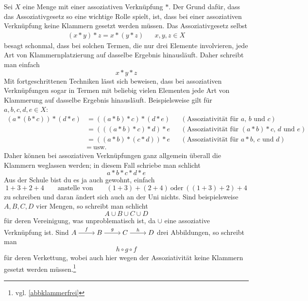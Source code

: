 \begin{bem} \label{klammerfrei}
    Sei $X$ eine Menge mit einer assoziativen Verknüpfung $*$. Der Grund dafür, dass das Assoziativgesetz so eine wichtige Rolle spielt, ist, dass bei einer assoziativen Verknüpfung keine Klammern gesetzt werden müssen. Das Assoziativgesetz selbst
    \begin{align*}
        (x*y)*z = x*(y*z) && x,y,z\in X
    \end{align*}
    besagt schonmal, dass bei solchen Termen, die nur drei Elemente involvieren, jede Art von Klammernplatzierung auf dasselbe Ergebnis hinausläuft. Daher schreibt man einfach
        \[ x*y*z \]
    Mit fortgeschrittenen Techniken lässt sich beweisen, dass bei assoziativen Verknüpfungen sogar in Termen mit beliebig vielen Elementen jede Art von Klammerung auf dasselbe Ergebnis hinausläuft. Beispielsweise gilt für $a,b,c,d,e\in X$:
    \begin{align*}
        (a*(b*c))*(d*e) & =((a*b)*c)*(d*e) && (\text{Assoziativität für $a$, $b$ und $c$})\\
        & = (((a*b)*c)*d)*e && (\text{Assoziativität für $(a*b)*c$, $d$ und $e$})  \\
        & = ((a*b)*(c*d))*e && (\text{Assoziativität für $a*b$, $c$ und $d$})\\
        &=\ \text{usw.}
    \end{align*}
    Daher können bei assoziativen Verknüpfungen ganz allgemein überall die Klammern weglassen werden; in diesem Fall schriebe man schlicht
        \[ a*b*c*d*e \]
    Aus der Schule bist du es ja auch gewohnt, einfach
        \[ 1+3+2+4 \qquad\text{anstelle von}\qquad (1+3)+(2+4)\ \text{oder}\ ((1+3)+2)+4 \]
    zu schreiben und daran ändert sich auch an der Uni nichts. Sind beispielsweise $A,B,C,D$ vier Mengen, so schreibt man schlicht
        \[ A\cup B\cup C \cup D \]
    für deren Vereinigung, was unproblematisch ist, da $\cup$ eine assoziative Verknüpfung ist. Sind $\begin{tikzcd}[cramped] A\ar[r, "f"] & B\ar[r, "g"] & C \ar[r, "h"] & D \end{tikzcd}$ drei Abbildungen, so schreibt man
        \[ h\circ g\circ f \]
    für deren Verkettung, wobei auch hier wegen der Assoziativität keine Klammern gesetzt werden müssen.\footnote{vgl. \cref{abbklammerfrei}}
\end{bem}


